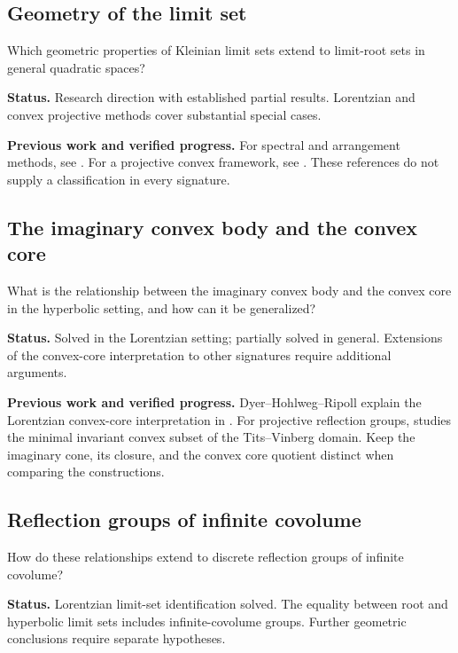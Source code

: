 \documentclass[11pt,reqno]{amsart}
\theoremstyle{plain}
\theoremstyle{definition}
\theoremstyle{remark}
\numberwithin{equation}{section}
\begin{document}
\subsection{Geometry of the limit set}
Which geometric properties of Kleinian limit sets extend to
limit-root sets in general quadratic spaces?


\par\medskip
\noindent\textbf{Status.} Research direction with established partial results. Lorentzian and convex projective methods cover substantial special cases.

\par\medskip
\noindent\textbf{Previous work and verified progress.}
For spectral and arrangement methods, see \cite[Sections~3--4]{ChenLabbe2017}.
For a projective convex framework, see \cite{DGKLM2025}.
These references do not supply a classification in every signature.


\subsection{The imaginary convex body and the convex core}
What is the relationship between the imaginary convex body and
the convex core in the hyperbolic setting, and how can it be generalized?


\par\medskip
\noindent\textbf{Status.} Solved in the Lorentzian setting; partially solved in general. Extensions of the convex-core interpretation to other signatures require additional arguments.

\par\medskip
\noindent\textbf{Previous work and verified progress.}
Dyer--Hohlweg--Ripoll explain the Lorentzian convex-core interpretation
in \cite[Section~7.4]{DHR}. For projective reflection groups,
\cite[Section~5]{DGKLM2025} studies the minimal invariant convex subset
of the Tits--Vinberg domain. Keep the imaginary cone, its closure,
and the convex core quotient distinct when comparing the constructions.

\subsection{Reflection groups of infinite covolume}
How do these relationships extend to discrete reflection groups
of infinite covolume?


\par\medskip
\noindent\textbf{Status.} Lorentzian limit-set identification solved. The equality between root and hyperbolic limit sets includes infinite-covolume groups. Further geometric conclusions require separate hypotheses.
\end{document}

